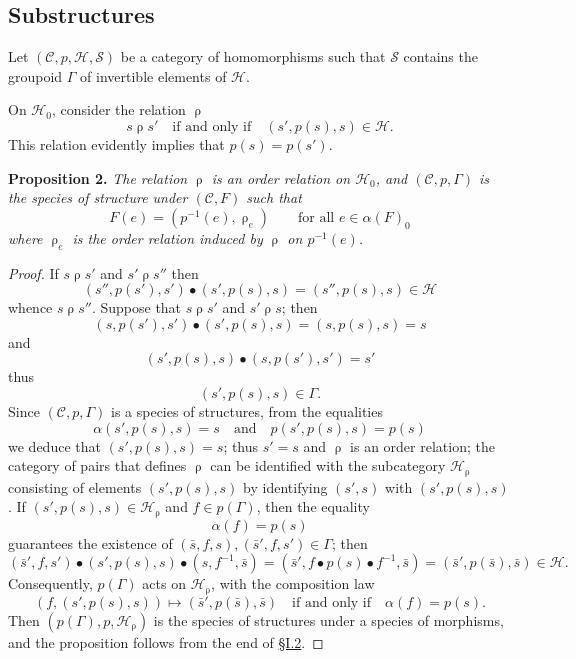\documentclass[a4paper,oneside,nobib,nofonts,notitlepage,notoc,nols,fleqn,justified]{tufte-book}
\newenvironment{itenv}[1]
  {\phantomsection\par\medskip\noindent\textbf{#1.}\itshape}
  {\par\medskip}
\newcommand{\oldpage}[1]{{\reversemarginpar\marginnote{\raggedleft\footnotesize\textit{p.~#1}}}}
\newcommand{\CC}{\mathcal{C}}
\newcommand{\HH}{\mathcal{H}}
\renewcommand{\SS}{\mathcal{S}}
\newcommand{\relrho}{\mathrel{\rho}}
\begin{document}
\subsection{Substructures}
\label{section:i.5}

Let $(\CC,p,\HH,\SS)$ be a category of homomorphisms such that $\SS$ contains the groupoid $\Gamma$ of invertible elements of $\HH$.

On $\HH_0$, consider the relation $\relrho$
\[
  s\relrho s'
  \quad\text{if and only if}\quad
  (s',p(s),s)\in\HH.
\]
This relation evidently implies that $p(s)=p(s')$.

\begin{itenv}{Proposition 2}
\label{proposition:i-2}
  The relation $\relrho$ is an order relation on $\HH_0$, and $(\CC,p,\Gamma)$ is the species of structure under $(\CC,F)$ such that
  \[
    F(e)
    = (p^{-1}(e),\relrho_e)
    \qquad\text{for all $e\in\alpha(F)_0$}
  \]
  where $\relrho_e$ is the order relation induced by $\relrho$ on $p^{-1}(e)$.
\end{itenv}

\begin{proof}
  If $s\relrho s'$ and $s'\relrho s''$ then
  \[
    (s'',p(s'),s')\bullet(s',p(s),s)
    = (s'',p(s),s)
    \in\HH
  \]
  whence $s\relrho s''$.
  Suppose that $s\relrho s'$ and $s'\relrho s$;
  then
  \[
    (s,p(s'),s')\bullet(s',p(s),s)
    = (s,p(s),s)
    = s
  \]
  and
  \[
    (s',p(s),s)\bullet(s,p(s'),s')
    = s'
  \]
  thus
  \[
    (s',p(s),s)\in\Gamma.
  \]
  \oldpage{359}
  Since $(\CC,p,\Gamma)$ is a species of structures, from the equalities
  \[
    \alpha(s',p(s),s)=s
    \quad\text{and}\quad
    p(s',p(s),s)=p(s)
  \]
  we deduce that $(s',p(s),s)=s$;
  thus $s'=s$ and $\relrho$ is an order relation;
  the category of pairs that defines $\relrho$ can be identified with the subcategory $\HH_{\relrho}$ consisting of elements $(s',p(s),s)$ by identifying $(s',s)$ with $(s',p(s),s)$.
  If $(s',p(s),s)\in\HH_{\relrho}$ and $f\in p(\Gamma)$, then the equality
  \[
    \alpha(f)=p(s)
  \]
  guarantees the existence of $(\bar{s},f,s),(\bar{s}',f,s')\in\Gamma$;
  then
  \[
    (\bar{s}',f,s')\bullet(s',p(s),s)\bullet(s,f^{-1},\bar{s})
    = (\bar{s}',f\bullet p(s)\bullet f^{-1},\bar{s})
    = (\bar{s}',p(\bar{s}),\bar{s})
    \in\HH.
  \]
  Consequently, $p(\Gamma)$ acts on $\HH_{\relrho}$, with the composition law
  \[
    (f,(s',p(s),s))
    \longmapsto (\bar{s}',p(\bar{s}),\bar{s})
    \quad\text{if and only if}\quad
    \alpha(f)=p(s).
  \]
  Then $(p(\Gamma),p,\HH_{\relrho})$ is the species of structures under a species of morphisms, and the proposition follows from the end of \hyperref[section:i.2]{§I.2}.
\end{proof}
\end{document}
